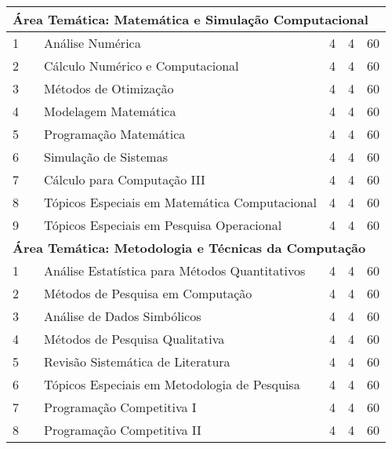 \documentclass[
	12pt,				%
	openright,			%
  oneside,     %
	a4paper,			%
	english,			%
	french,				%
	spanish,			%
	brazil				%
	]{abntex2}
\begin{document}
\begin{apendicesenv}
\begin{longtable}{r|r|l|r|r|r}
\multicolumn{6}{l}{\textbf{Área Temática: Matemática e Simulação Computacional}} \\ \hline
    1     &       & Análise Numérica & 4     & 4     & 60 \\ \hline
    2     &       & Cálculo Numérico e Computacional & 4     & 4     & 60 \\ \hline
    3     &       & Métodos de Otimização & 4     & 4     & 60 \\ \hline
    4     &       & Modelagem Matemática & 4     & 4     & 60 \\ \hline
    5     &       & Programação Matemática & 4   & 4  & 60 \\ \hline
    6     &       & Simulação de Sistemas & 4     & 4     & 60 \\ \hline
    7     &       & Cálculo para Computação III & 4     & 4     & 60 \\ \hline
    8     &       & \small{Tópicos Especiais em Matemática Computacional} & 4     & 4     & 60 \\ \hline
    9     &       & \small{Tópicos Especiais em Pesquisa Operacional} & 4     & 4     & 60 \\ \hline

\multicolumn{6}{l}{\textbf{Área Temática: Metodologia e Técnicas da Computação}} \\ \hline
    1     &       & \small{Análise Estatística para Métodos Quantitativos} & 4     & 4     & 60 \\ \hline
    2     &       & Métodos de Pesquisa em Computação & 4     & 4     & 60 \\ \hline
    3     &       & Análise de Dados Simbólicos & 4     & 4     & 60 \\ \hline
    4     &       & Métodos de Pesquisa Qualitativa & 4     & 4     & 60 \\ \hline
    5     &       & Revisão Sistemática de Literatura & 4     & 4     & 60 \\ \hline
    6     &       & \small{Tópicos Especiais em Metodologia de Pesquisa} & 4     & 4     & 60 \\ \hline
    7     &       & Programação Competitiva I & 4     & 4     & 60 \\ \hline
    8     &       & Programação Competitiva II & 4     & 4     & 60 \\ \hline


\end{longtable}
\end{apendicesenv}
\end{document}
